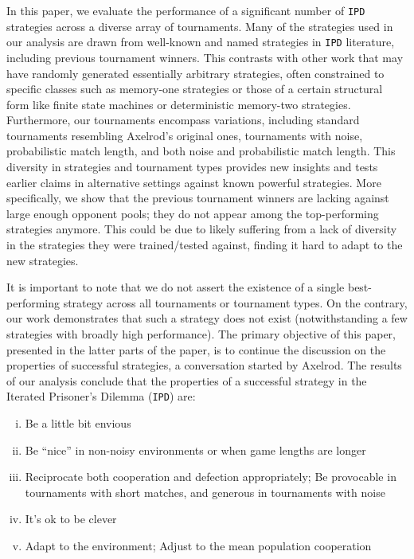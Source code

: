 \documentclass{article}
\def\IPD{\texttt{IPD}}
\begin{document}
In this paper, we evaluate the performance of a significant number of \IPD{}
strategies across a diverse array of tournaments. Many of the strategies used in
our analysis are drawn from well-known and named strategies in \IPD{}
literature, including previous tournament winners. This contrasts with other
work that may have randomly generated essentially arbitrary strategies, often
constrained to specific classes such as memory-one strategies or those of a
certain structural form like finite state machines or deterministic memory-two
strategies. Furthermore, our tournaments encompass variations, including standard
tournaments resembling Axelrod's original ones, tournaments with noise,
probabilistic match length, and both noise and probabilistic match length. This
diversity in strategies and tournament types provides new insights and tests
earlier claims in alternative settings against known powerful strategies.
More specifically, we show that the previous tournament
winners are lacking against large enough opponent pools; they do not appear
among the top-performing strategies anymore. This could be due to likely
suffering from a lack of diversity in the strategies they were trained/tested
against, finding it hard to adapt to the new strategies.

It is important to note that we do not assert the existence of a single
best-performing strategy across all tournaments or tournament types. On the
contrary, our work demonstrates that such a strategy does not exist
(notwithstanding a few strategies with broadly high performance). The primary
objective of this paper, presented in the latter parts of the paper, is to
continue the discussion on the properties of successful strategies, a
conversation started by Axelrod. 
The results of our analysis conclude that the properties of a successful
strategy in the Iterated Prisoner's Dilemma (\IPD{}) are:

\begin{enumerate}[(i)]
    \item Be a little bit envious
    \item Be ``nice'' in non-noisy environments or when game lengths are longer
    \item Reciprocate both cooperation and defection appropriately;
    Be provocable in tournaments with short matches, and generous in tournaments with noise
    \item It's ok to be clever
    \item Adapt to the environment; Adjust to the mean population cooperation
\end{enumerate}
\end{document}
